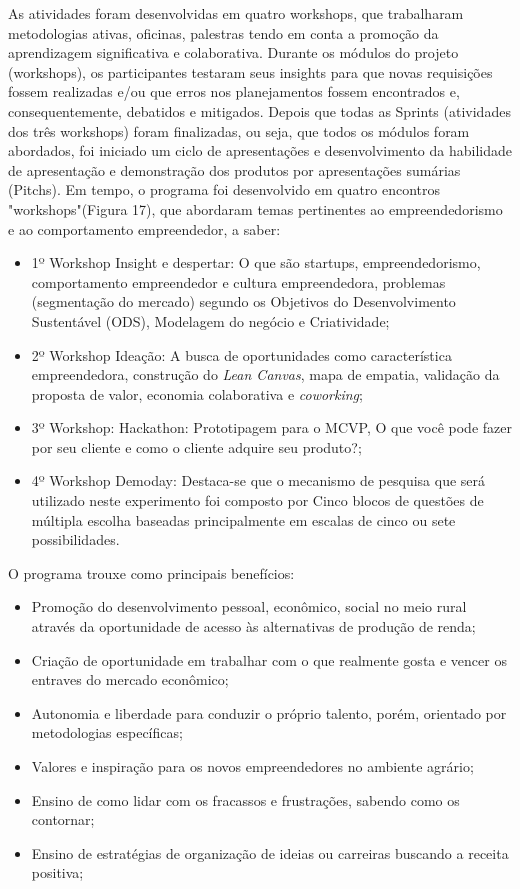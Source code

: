 As atividades foram desenvolvidas em quatro workshops, que trabalharam metodologias ativas, oficinas, palestras tendo em conta a promoção da aprendizagem significativa e colaborativa. Durante os módulos do projeto (workshops), os participantes testaram seus insights para que novas requisições fossem realizadas e/ou que erros nos planejamentos fossem encontrados e, consequentemente, debatidos e mitigados. Depois que todas as Sprints (atividades dos três workshops) foram finalizadas, ou seja, que todos os módulos foram abordados, foi iniciado um ciclo de apresentações e desenvolvimento da habilidade de apresentação e demonstração dos produtos por apresentações sumárias (Pitchs). Em tempo, o programa foi desenvolvido em quatro encontros "workshops"(Figura 17), que abordaram temas pertinentes ao empreendedorismo e ao comportamento empreendedor, a saber:


\begin{itemize}

\item {1º Workshop Insight e despertar: O que são startups, empreendedorismo, comportamento empreendedor e cultura empreendedora, problemas (segmentação do mercado) segundo os Objetivos do Desenvolvimento Sustentável (ODS), Modelagem do negócio e Criatividade;}
\item {2º Workshop Ideação: A busca de oportunidades como característica empreendedora, construção do \textit{Lean Canvas}, mapa de empatia, validação da proposta de valor, economia colaborativa e \textit{coworking};}
\item {3º Workshop: Hackathon: Prototipagem para o MCVP, O que você pode fazer por seu cliente e como o cliente adquire seu produto?;}
\item {4º Workshop Demoday: Destaca-se que o mecanismo de pesquisa que será utilizado neste experimento foi composto por Cinco blocos de questões de múltipla escolha baseadas principalmente em escalas de cinco ou sete possibilidades.}
\end{itemize}


O programa trouxe como principais benefícios: 

\begin{itemize}
\item{Promoção do desenvolvimento pessoal, econômico, social no meio rural através da oportunidade de acesso às alternativas de produção de renda;}
\item{Criação de oportunidade em trabalhar com o que realmente gosta e vencer os entraves do mercado econômico;}
\item{Autonomia e liberdade para conduzir o próprio talento, porém, orientado por metodologias específicas;}
\item{Valores e inspiração para os novos empreendedores no ambiente agrário;}
\item{Ensino de como lidar com os fracassos e frustrações, sabendo como os contornar;}
\item{Ensino de estratégias de organização de ideias ou carreiras buscando a receita positiva;}
\end{itemize}


